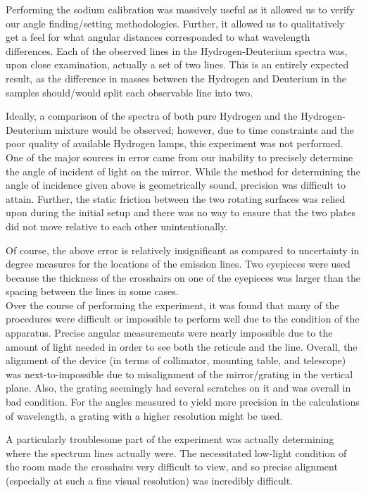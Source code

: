 \documentclass[paper=a4, fontsize=11pt]{scrartcl} %
\numberwithin{equation}{section}
\numberwithin{figure}{section}
\numberwithin{table}{section}
\begin{document}
Performing the sodium calibration was massively useful as it allowed us to verify our angle finding/setting methodologies. Further, it allowed us to qualitatively get a feel for what angular distances corresponded to what wavelength differences. Each of the observed lines in the Hydrogen-Deuterium spectra was, upon close examination, actually a set of two lines. This is an entirely expected result, as the difference in masses between the Hydrogen and Deuterium in the samples should/would split each observable line into two.

Ideally, a comparison of the spectra of both pure Hydrogen and the Hydrogen-Deuterium mixture would be observed; however, due to time constraints and the poor quality of available Hydrogen lamps, this experiment was not performed. \\

One of the major sources in error came from our inability to precisely determine the angle of incident of light on the mirror. While the method for determining the angle of incidence given above is geometrically sound, precision was difficult to attain. Further, the static friction between the two rotating surfaces was relied upon during the initial setup and there was no way to ensure that the two plates did not move relative to each other unintentionally.

Of course, the above error is relatively insignificant as compared to uncertainty in degree measures for the locations of the emission lines. Two eyepieces were used because the thickness of the crosshairs on one of the eyepieces was larger than the spacing between the lines in some cases. \\

Over the course of performing the experiment, it was found that many of the procedures were difficult or impossible to perform well due to the condition of the apparatus. Precise angular measurements were nearly impossible due to the amount of light needed in order to see both the reticule and the line. Overall, the alignment of the device (in terms of collimator, mounting table, and telescope) was next-to-impossible due to misalignment of the mirror/grating in the vertical plane. Also, the grating seemingly had several scratches on it and was overall in bad condition. For the angles measured to yield more precision in the calculations of wavelength, a grating with a higher resolution might be used.

A particularly troublesome part of the experiment was actually determining where the spectrum lines actually were. The necessitated low-light condition of the room made the crosshairs very difficult to view, and so precise alignment (especially at such a fine visual resolution) was incredibly difficult.
\end{document}
